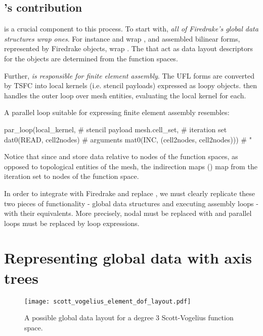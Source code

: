 \documentclass[thesis]{subfiles}
\begin{document}
\subsection{'s contribution}

 is a crucial component to this process.
To start with, \emph{all of Firedrake's global data structures wrap  ones}.
For instance  and  wrap  , and assembled bilinear forms, represented by Firedrake  objects, wrap  .
The  that act as data layout descriptors for the  objects are determined from the function spaces.

Further, \emph{ is responsible for finite element assembly}.
The UFL forms are converted by TSFC into local kernels (i.e. stencil payloads) expressed as loopy  objects.
 then handles the outer loop over mesh entities, evaluating the local kernel for each.

A parallel loop suitable for expressing finite element assembly resembles:
\begin{pyinline}
  par_loop(local_kernel,                         # stencil payload
           mesh.cell_set,                        # iteration set
           dat0(READ, cell2nodes)                # arguments
           mat0(INC, (cell2nodes, cell2nodes)))  #   "
\end{pyinline}
Notice that since  and  store data relative to nodes of the function spaces, as opposed to topological entities of the mesh, the indirection maps () map from the iteration set to nodes of the function space.

In order to integrate  with Firedrake and replace , we must clearly replicate these two pieces of functionality - global data structures and executing assembly loops - with their  equivalents.
More precisely, nodal  must be replaced with  and  parallel loops must be replaced by  loop expressions.

\section{Representing global data with axis trees}

\begin{figure}
  \centering
  \texttt{[image: scott\_vogelius\_element\_dof\_layout.pdf]}
  \caption{
    A possible global data layout for a degree 3 Scott-Vogelius function space.
  }
  \label{fig:firedrake_data_tree}
\end{figure}
\end{document}
